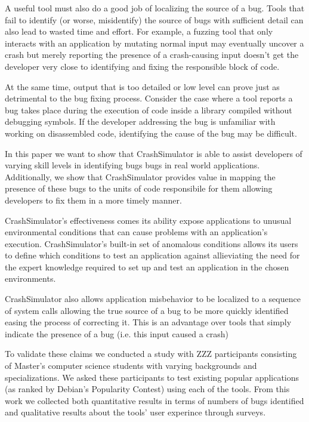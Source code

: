 A useful tool must also do a good job of localizing the source of a bug.
Tools that fail to identify (or worse, misidentify) the source of bugs with
sufficient detail can also lead to wasted time and effort.  For example, a
fuzzing tool that only interacts with an application by mutating normal
input may eventually uncover a crash but merely reporting the presence of a
crash-causing input doesn't get the developer very close to identifying and
fixing the responsible block of code.

At the same time, output that is too detailed or low level can prove just
as detrimental to the bug fixing process.  Consider the case where a tool
reports a bug takes place during the execution of code inside a library
compiled without debugging symbols.  If the developer addressing the bug is
unfamiliar with working on disassembled code, identifying the cause of the
bug may be difficult.

In this paper we want to show that CrashSimulator is able to assist
developers of varying skill levels in identifying bugs bugs in real world
applications.  Additionally, we show that CrashSimulator provides value in
mapping the presence of these bugs to the units of code responsibile for
them allowing developers to fix them in a more timely manner.

CrashSimulator's effectiveness comes its ability expose applications to
unusual environmental conditions that can cause problems with an
application's execution.  CrashSimulator's built-in set of anomalous
conditions allows its users to define which conditions to test an
application against allieviating the need for the expert knowledge required
to set up and test an application in the chosen environments.

CrashSimulator also allows application misbehavior to be localized to a
sequence of system calls allowing the true source of a bug to be more
quickly identified easing the process of correcting it.  This is an
advantage over tools that simply indicate the presence of a bug (i.e.  this
input caused a crash)

To validate these claims we conducted a study with ZZZ participants
consisting of Master's computer science students with varying backgrounds
and specializations.  We asked these participants to test existing popular
applications (as ranked by Debian's Popularity Contest) using each of the
tools.  From this work we collected both quantitative results in terms of
numbers of bugs identified and qualitative results about the tools' user
experince through surveys.


